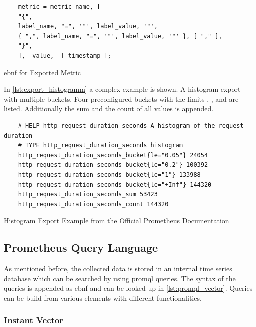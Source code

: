 \begin{listing}[!ht]
	\begin{verbatim}
	metric = metric_name, [ 
	"{",
	label_name, "=", '"', label_value, '"',
	{ ",", label_name, "=", '"', label_value, '"' }, [ "," ], 
	"}",
	],  value,  [ timestamp ];
	\end{verbatim}
	\caption{\gls{ebnf} for Exported Metric}
	\label{lst:ebnf_metric_export}
\end{listing}

In \cref{lst:export_histogramm} a complex example is shown. A histogram export with multiple buckets. Four preconfigured buckets with the limits , ,  and  are listed. Additionally the sum and the count of all values is appended. 

\begin{listing}[!ht]
	\begin{verbatim}
	# HELP http_request_duration_seconds A histogram of the request duration
	# TYPE http_request_duration_seconds histogram
	http_request_duration_seconds_bucket{le="0.05"} 24054
	http_request_duration_seconds_bucket{le="0.2"} 100392
	http_request_duration_seconds_bucket{le="1"} 133988
	http_request_duration_seconds_bucket{le="+Inf"} 144320
	http_request_duration_seconds_sum 53423
	http_request_duration_seconds_count 144320
	\end{verbatim}
	\caption[Histogram Export Example from the Official Prometheus Documentation]{Histogram Export Example from the Official Prometheus Documentation~\cite{PrometheusExpositionFormatBeispiel}}
	\label{lst:export_histogramm}
\end{listing}

\subsection{Prometheus Query Language}
\label{subsec:promql}

As mentioned before, the collected data is stored in an internal time series database which can be searched by using \gls{promql} queries.
The syntax of the queries is appended as \gls{ebnf} and can be looked up in \cref{lst:promql_vector}.
Queries can be build from various elements with different functionalities.

\subsubsection{Instant Vector}

